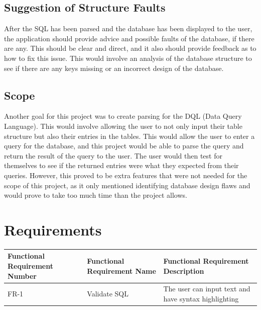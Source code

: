 \subsection{Suggestion of Structure Faults}

After the SQL has been parsed and the database has been displayed to the user, the application should provide advice and possible faults of the database, if there are any. This should be clear and direct, and it also should provide feedback as to how to fix this issue. This would involve an analysis of the database structure to see if there are any keys missing or an incorrect design of the database.

\subsection{Scope}

Another goal for this project was to create parsing for the DQL (Data Query Language). This would involve allowing the user to not only input their table structure but also their entries in the tables. This would allow the user to enter a query for the database, and this project would be able to parse the query and return the result of the query to the user. The user would then test for themselves to see if the returned entries were what they expected from their queries. However, this proved to be extra features that were not needed for the scope of this project, as it only mentioned identifying database design flaws and would prove to take too much time than the project allows.


\section{Requirements}

\begin{center}
	\setlength\extrarowheight{2pt}
	\begin{tabularx}{\textwidth}{|X|X|X|}
		
		\hline
		\textbf{Functional Requirement Number} & \textbf{Functional Requirement Name} & \textbf{Functional Requirement Description} \\
		\hline
		FR-1 & Validate SQL & The user can input text and have syntax highlighting \\
		\hline
	\end{tabularx}
	
\end{center}

